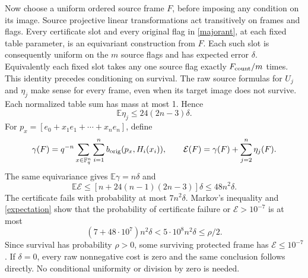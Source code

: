 \documentclass[11pt]{article}
\newcommand{\F}{\mathbb F}
\begin{document}
Now choose a uniform ordered source frame $F$, before imposing any
condition on its image. Source projective linear transformations act
transitively on frames and flags. Every certificate slot and every
original flag in \eqref{majorant}, at each fixed table parameter, is
an equivariant construction from $F$. Each such slot is consequently
uniform on the $m$ source flags and has expected error $\delta$.
Equivalently each fixed slot takes any one source flag exactly
$F_{\rm count}/m$ times. This identity precedes conditioning on survival.
The raw source formulas for $U_j$ and $\eta_j$ make sense for every
frame, even when its target image does not survive. Each normalized
table sum has mass at most 1. Hence
\[
 \mathbb E\eta_j\leq24(2n-3)\delta.
\]
For $p_x=[e_0+x_1e_1+\cdots+x_ne_n]$, define
\[
 \gamma(F)=q^{-n}\sum_{x\in\F_q^n}\sum_{i=1}^n
 b_{\rm orig}(p_x,H_i(x_i)),\qquad
 \mathcal E(F)=\gamma(F)+\sum_{j=2}^n\eta_j(F).
\]
The same equivariance gives $\mathbb E\gamma=n\delta$ and
\begin{equation}\label{expectation}
 \mathbb E\mathcal E\leq[n+24(n-1)(2n-3)]\delta\leq48n^2\delta.
\end{equation}
The certificate fails with probability at most $7n^2\delta$.
Markov's inequality and \eqref{expectation} show that the probability
of certificate failure or $\mathcal E>10^{-7}$ is at most
\[
 (7+48\cdot10^7)n^2\delta<5\cdot10^8n^2\delta\leq\rho/2.
\]
Since survival has probability $\rho>0$, some surviving protected frame
has $\mathcal E\leq10^{-7}$. If $\delta=0$, every raw nonnegative
cost is zero and the same conclusion follows directly. No conditional
uniformity or division by zero is needed.
\end{document}
